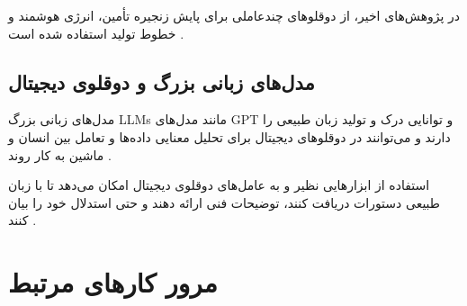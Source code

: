 
در پژوهش‌های اخیر، از دوقلوهای چندعاملی برای پایش زنجیره تأمین، انرژی هوشمند و خطوط تولید استفاده شده است \cite{liu2024ai}. 


\subsection{مدل‌های زبانی بزرگ و دوقلوی دیجیتال}

مدل‌های زبانی بزرگ 
\glspl{LLM}
 مانند مدل‌های 
 \gls{GPT}
 و 
  توانایی درک و تولید زبان طبیعی را دارند و می‌توانند در دوقلوهای دیجیتال برای تحلیل معنایی داده‌ها و تعامل بین انسان و ماشین به کار روند \cite{Pizon2026integrating,liu2025empoweringdt}. 



استفاده از ابزارهایی نظیر 
 و 
  به عامل‌های دوقلوی دیجیتال امکان می‌دهد تا با زبان طبیعی دستورات دریافت کنند، توضیحات فنی ارائه دهند و حتی استدلال خود را بیان کنند \cite{park2025interactive}.


\section{مرور کارهای مرتبط}

